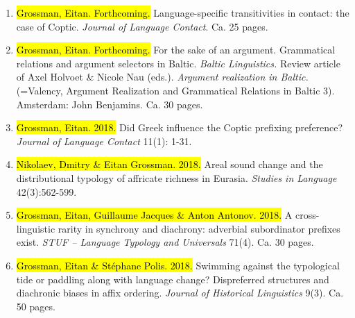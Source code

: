 \documentclass[letterpaper,11pt]{article}
\begin{document}
\begin{enumerate}[resume]




\item {\hl{Grossman, Eitan. Forthcoming.}} Language-specific transitivities in contact: the case of Coptic. \textit{Journal of Language Contact}. Ca. 25 pages.

\item {\hl{Grossman, Eitan. Forthcoming.}} For the sake of an argument. Grammatical relations and argument selectors in Baltic. \textit{Baltic Linguistics.} Review article of Axel Holvoet \& Nicole Nau (eds.). \textit{Argument realization in Baltic.} (=Valency, Argument Realization and Grammatical Relations in Baltic 3). Amsterdam: John Benjamins. Ca. 30 pages.

\item {\hl{Grossman, Eitan. 2018.}} Did Greek influence the Coptic prefixing preference? \textit{Journal of Language Contact} 11(1): 1-31.

\item {\hl{Nikolaev, Dmitry \& Eitan Grossman. 2018.}} Areal sound change and the distributional typology of affricate richness in Eurasia. \textit{Studies in Language} 42(3):562-599.

\item {\hl{Grossman, Eitan, Guillaume Jacques \& Anton Antonov. 2018.}} A cross-linguistic rarity in synchrony and diachrony: adverbial subordinator prefixes exist. \textit{STUF -- Language Typology and Universals} 71(4). Ca. 30 pages.

\item {\hl{Grossman, Eitan \& St\'ephane Polis. 2018.}} Swimming against the typological tide or paddling along with language change? Dispreferred structures and diachronic biases in affix ordering. \textit{Journal of Historical Linguistics} 9(3). Ca. 50 pages.


\end{enumerate}
\end{document}
